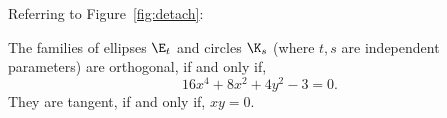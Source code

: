 \noindent Referring to Figure~\ref{fig:detach}:

\begin{remark}
The families of ellipses $\E_t$ and circles  $\K_s$ (where $t,s$ are independent parameters)
 are orthogonal,
 if and only if,
 \[   16x^4+8x^2+4y^2-3=0.\]
 They are tangent,  if and only if, $x y=0$.
 \label{rem:perp-locus}
 \end{remark}
 
